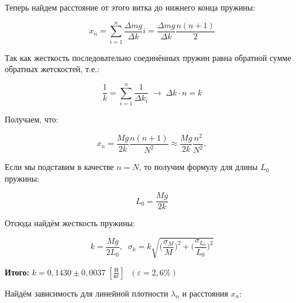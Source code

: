 \documentclass[a4paper, 12pt]{article}
\begin{document}
\bigskip

Теперь найдем расстояние от этого витка до нижнего конца пружины:

\bigskip

\begin{equation}
    x_{n} = \sum_{i=1}^{n} \frac{\varDelta m g}{\varDelta k} i = \frac{\varDelta mg}{\varDelta k} \frac{n(n+1)}{2} 
\end{equation}

\bigskip

Так как жесткость последовательно соединённых пружин равна обратной сумме обратных жетскостей, т.е.:

\bigskip

\begin{equation}
    \frac{1}{k} = \sum_{i = 1}^{n} \frac{1}{\varDelta k_{i}} \; \rightarrow \; \varDelta k \cdot n = k
\end{equation}

Получаем, что:

\bigskip

\begin{equation}
    x_{n} = \frac{Mg}{2k} \frac{n(n+1)}{N^2} \approx \frac{Mg}{2k} \frac{n^2}{N^2},
\end{equation}

\bigskip

Если мы подставим в качестве $ n = N $, то получим формулу для длины $ L_{0} $ пружины:

\bigskip

\begin{equation}  
    L_{0} = \frac{Mg}{2k} \label{length} 
\end{equation}  

\bigskip

Отсюда найдём жесткость пружины:

\bigskip

\begin{equation}
    k = \frac{Mg}{2L_{0}}, \; \;
    \sigma_{k} = k \sqrt{\bigg(\frac{\sigma_{M}}{M}\bigg)^2 + \bigg(\frac{\sigma_{L_{0}}}{L_{0}}\bigg)^2}
\end{equation}

\bigskip

\begin{center}
    \textbf{Итого:} \underline{$ k = 0,1430 \pm 0,0037 \; [\frac{\text{Н}}{\text{кг}}] $} $ \; (\varepsilon = 2,6 \%) $  
\end{center}

\bigskip

Найдём зависимость для линейной плотности $ \lambda_{n} $ и расстояния $ x_{n} $:
\end{document}
